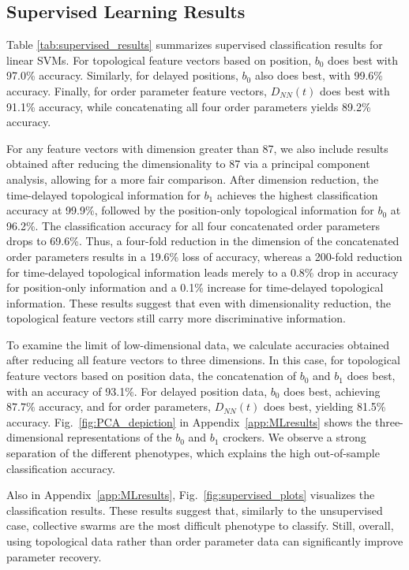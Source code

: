 \documentclass[%
 aip,
reprint,
 amsmath,amssymb,
 aps,
showkeys
]{revtex4-1}
\begin{document}
\subsection{Supervised Learning Results\label{sec:supervised}}

Table \ref{tab:supervised_results} summarizes supervised classification results for linear SVMs. For topological feature vectors based on position, $b_0$ does best with 97.0\% accuracy. Similarly, for delayed positions, $b_0$ also does best, with 99.6\% accuracy. Finally, for order parameter feature vectors, $D_{NN}(t)$ does best with 91.1\% accuracy, while concatenating all four order parameters yields 89.2\% accuracy.

For any feature vectors with dimension greater than 87, we also include results obtained after reducing the dimensionality to 87 via a principal component analysis, allowing for a more fair comparison. After dimension reduction, the time-delayed topological information for $b_1$ achieves the highest  classification accuracy at 99.9\%, followed by the position-only topological information for $b_0$ at 96.2\%. The classification accuracy for  all four concatenated order parameters drops to 69.6\%. Thus, a four-fold reduction in the dimension of the concatenated order parameters results in a 19.6\% loss of accuracy, whereas a 200-fold reduction for time-delayed topological information leads merely to a 0.8\% drop in accuracy for position-only information and a 0.1\% increase for time-delayed topological information. These results suggest that even with dimensionality reduction, the topological feature vectors still carry more discriminative information. 

To examine the limit of low-dimensional data, we calculate accuracies obtained after reducing all feature vectors to three dimensions. In this case, for topological feature vectors based on position data, the concatenation of $b_0$ and $b_1$ does best, with an accuracy of 93.1\%. For delayed position data, $b_0$ does best, achieving $87.7\%$ accuracy, and for order parameters, $D_{NN}(t)$ does best, yielding 81.5\% accuracy. Fig.~\ref{fig:PCA_depiction} in Appendix~\ref{app:MLresults} shows the three-dimensional representations of the $b_0$ and $b_1$ crockers. We observe a strong separation of the different phenotypes, which explains the high out-of-sample classification accuracy.

Also in Appendix~\ref{app:MLresults}, Fig.~\ref{fig:supervised_plots} visualizes the classification results. These results suggest that, similarly to the unsupervised case, collective swarms are the most difficult phenotype to classify. Still, overall, using topological data rather than order parameter data can significantly improve parameter recovery.
\end{document}
